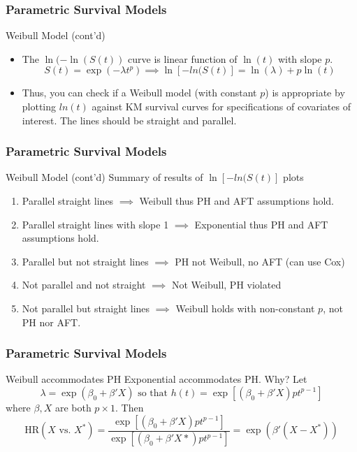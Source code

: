 \documentclass{beamer}
\theoremstyle{definition}
\begin{document}
\begin{frame}
\frametitle{Parametric Survival Models}
\begin{block}{Weibull Model (cont'd)}
\begin{itemize}
\item The $\ln(-\ln(S(t))$ curve is linear function of $\ln(t)$ with slope $p$. 
\[ S(t)  = \exp(-\lambda t^p) \implies \ln[-ln(S(t)] = \ln(\lambda) + p \ln(t) 
\]
\item Thus, you can check if a Weibull model (with constant $p$) is appropriate by plotting $ln(t)$ against KM survival curves for specifications of covariates of interest. The lines should be straight and parallel. 

\end{itemize} 
\end{block}
\end{frame}


\begin{frame}
\frametitle{Parametric Survival Models}
\begin{block}{Weibull Model (cont'd)}
Summary of results of $\ln[-ln(S(t)]$ plots
\begin{enumerate}
\item Parallel straight lines $\implies$ Weibull thus PH and AFT assumptions hold. 
\item Parallel straight lines with slope 1 $\implies$ Exponential thus PH and AFT assumptions hold. 
\item Parallel but not straight lines $\implies$ PH not Weibull, no AFT (can use Cox)
\item Not parallel and not straight $\implies$ Not Weibull, PH violated
\item Not parallel but straight lines $\implies$ Weibull holds with non-constant $p$, not PH nor AFT. 
\end{enumerate}
\end{block}
\end{frame}

\begin{frame}
\frametitle{Parametric Survival Models}
\begin{block}{Weibull accommodates PH}
Exponential accommodates PH. Why? Let
\[
\lambda=\exp(\beta_0 + \beta' X) \text{ so that }  h(t) = \exp[(\beta_0 + \beta' X) p t^{p-1}]
\] where $\beta, X$ are both $p \times 1$.
Then
\[
\text{HR}(X \text{ vs. } X^*)  = \dfrac{ \exp[(\beta_0 + \beta' X) p t^{p-1}]}{ \exp[(\beta_0 + \beta' X*) p t^{p-1}]} = \exp(\beta'(X - X^*))
\]
\end{block}
\end{frame}
\end{document}
